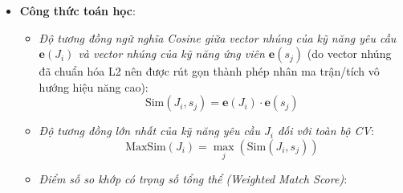 \begin{itemize}
    \textbf{Thứ tự áp dụng và tương tác giữa các quy tắc.} Sáu quy tắc trên được áp dụng \textit{tuần tự} theo đúng thứ tự cài đặt trong mã nguồn (\texttt{match\_cv.py}): (1) Đồng nhất loại hình và Độc quyền chứng chỉ (khác loại, hoặc một bên là chứng chỉ $\rightarrow 0{,}0$); (2) Độc quyền công cụ; (3) Bộ lọc ngôn ngữ; (4) Đặc hiệu phân nhóm (khác phân nhóm $\rightarrow 0{,}0$); (5) Tăng cường cùng phân nhóm ($\times 1{,}2$, chặn trần $1{,}0$); (6) Khớp nhanh kỹ năng mềm. Do các quy tắc ép về $0{,}0$ được đặt trước, một cặp kỹ năng đã bị loại ($\text{sim} = 0$) sẽ không thể được ``phục hồi'' bởi quy tắc tăng cường (vì $0 \times 1{,}2 = 0$) hay quy tắc khớp nhanh kỹ năng mềm (vì điều kiện $\text{sim} > 0{,}35$ không còn thỏa). Nhờ vậy, thứ tự này bảo đảm các ràng buộc loại trừ luôn có ưu tiên cao hơn các quy tắc tăng cường, cho kết quả xác định và nhất quán. Cần lưu ý một đánh đổi: vì quy tắc Đặc hiệu phân nhóm ép $0{,}0$ khi hai kỹ năng khác \texttt{category}, một số cặp kỹ năng liên quan chéo phân nhóm có thể bị triệt tiêu; đây là lựa chọn thiên về độ chính xác (giảm khớp sai) và được nhìn nhận lại ở phần hạn chế.
    \item \textbf{Công thức toán học}:
    \begin{itemize}
        \item \textit{Độ tương đồng ngữ nghĩa Cosine giữa vector nhúng của kỹ năng yêu cầu $\mathbf{e}(J_i)$ và vector nhúng của kỹ năng ứng viên $\mathbf{e}(s_j)$} (do vector nhúng đã chuẩn hóa L2 nên được rút gọn thành phép nhân ma trận/tích vô hướng hiệu năng cao):
        \begin{equation}
        \text{Sim}(J_i, s_j) = \mathbf{e}(J_i) \cdot \mathbf{e}(s_j)
        \end{equation}
        \item \textit{Độ tương đồng lớn nhất của kỹ năng yêu cầu $J_i$ đối với toàn bộ CV}:
        \begin{equation}
        \text{MaxSim}(J_i) = \max_{j} \left( \text{Sim}(J_i, s_j) \right)
        \end{equation}
        \item \textit{Điểm số so khớp có trọng số tổng thể (Weighted Match Score)}:
        \begin{equation}

\end{equation}
\end{itemize}
\end{itemize}
